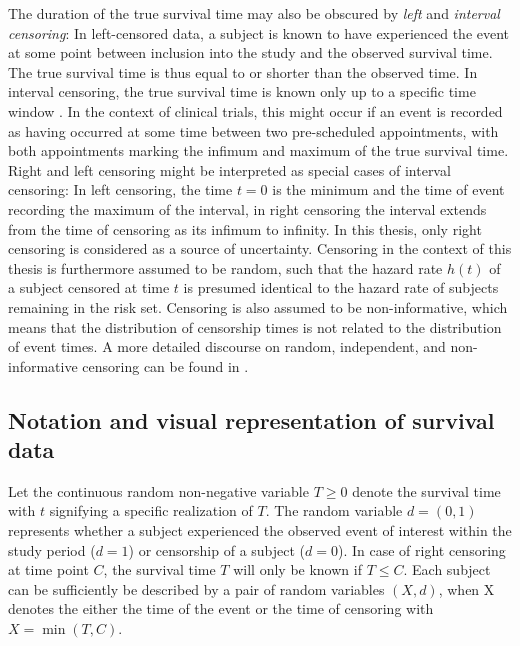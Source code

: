 \documentclass[main.tex]{subfiles}
\begin{document}
The duration of the true survival time may also be obscured by \textit{left} and \textit{interval censoring}: In left-censored data, a subject is known to have experienced the event at some point between inclusion into the study and the observed survival time. The true survival time is thus equal to or shorter than the observed time. In interval censoring, the true survival time is known only up to a specific time window \parencite{lindsey1998methods}. In the context of clinical trials, this might occur if an event is recorded as having occurred at some time between two pre-scheduled appointments, with both appointments marking the infimum and maximum of the true survival time. Right and left censoring might be interpreted as special cases of interval censoring: In left censoring, the time $t = 0$ is the minimum and the time of event recording the maximum of the interval, in right censoring the interval extends from the time of censoring as its infimum to infinity. In this thesis, only right censoring is considered as a source of uncertainty. Censoring in the context of this thesis is furthermore assumed to be random, such that the hazard rate $h(t)$ of a subject censored at time $t$ is presumed identical to the hazard rate of subjects remaining in the risk set. Censoring is also assumed to be non-informative, which means that the distribution of censorship times is not related to the distribution of event times. A  more detailed discourse on random, independent, and non-informative censoring can be found in \parencite{kleinbaum2012survival}.

\subsection{Notation and visual representation of survival data}
Let the continuous random non-negative variable $T\geq0$ denote the survival time with $t$ signifying a specific realization of $T$. The random variable $d = (0,1)$ represents whether a subject experienced the observed event of interest within the study period ($d = 1$) or censorship of a subject ($d = 0$). In case of right censoring at time point $C$, the survival time $T$ will only be known if $T\leq C$. Each subject can be sufficiently be described by a pair of random variables $(X, d)$, when X denotes the either the time of the event or the time of censoring with $X=\min(T, C)$.
\end{document}
